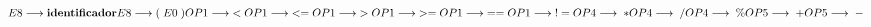 \begin{math}
    E8 \longrightarrow \textbf{identificador}\\
    E8 \longrightarrow (\;E0\;)\\
    OP1 \longrightarrow \;<\\
    OP1 \longrightarrow \;<=\\
    OP1 \longrightarrow \;>\\
    OP1 \longrightarrow \;>=\\
    OP1 \longrightarrow \;==\\
    OP1 \longrightarrow \;!=\\
    OP4 \longrightarrow \;*\\
    OP4 \longrightarrow \;/\\  
    OP4 \longrightarrow \;\%\\  
    OP5 \longrightarrow \;+\\  
    OP5 \longrightarrow \;-\\  

\end{math}
